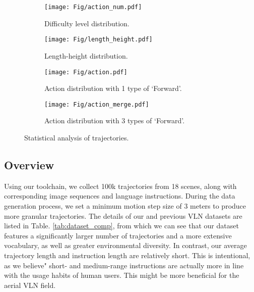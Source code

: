 \begin{figure}
    \centering
    \begin{subfigure}[b]{0.47\columnwidth}
        \centering
        \texttt{[image: Fig/action\_num.pdf]}
        \caption{Difficulty level distribution.}
        \label{fig:sub1}
    \end{subfigure}
    \hfill
    \begin{subfigure}[b]{0.47\columnwidth}
        \centering
        \texttt{[image: Fig/length\_height.pdf]}
        \caption{Length-height distribution.}
        \label{fig:sub2}
    \end{subfigure}

    \vspace{0.5cm} 

    \begin{subfigure}[b]{0.47\columnwidth}
        \centering
       
        \texttt{[image: Fig/action.pdf]}
        \caption{Action distribution with 1 type of `Forward'.}
        \label{fig:sub3}
    \end{subfigure}
    \hfill
    \begin{subfigure}[b]{0.47\columnwidth}
        \centering
        \texttt{[image: Fig/action\_merge.pdf]}
        \caption{Action distribution with 3 types of `Forward'.}
        \label{fig:sub4}
    \end{subfigure}

    \caption{Statistical analysis of trajectories.}
    \label{fig:traj_sta}
\end{figure}



\subsection{Overview}
Using our toolchain, we collect 100k trajectories from 18 scenes, along with corresponding image sequences and language instructions. During the data generation process, we set a minimum motion step size of 3 meters to produce more granular trajectories. The details of our and previous VLN datasets are listed in Table. \ref{tab:dataset_comp}, from which we can see that our dataset features a significantly larger number of trajectories and a more extensive vocabulary, as well as greater environmental diversity. In contrast, our average trajectory length and instruction length are relatively short. This is intentional, as we believe" short- and medium-range instructions are actually more in line with the usage habits of human users. This might be more beneficial for the aerial VLN field.

